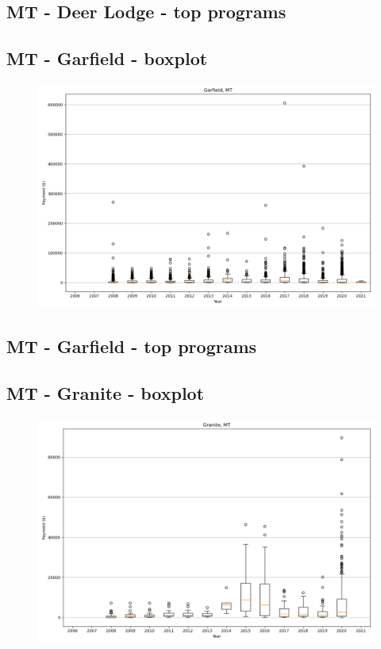 \subsection*{MT - Deer Lodge - top programs}

\newpage
\subsection*{MT - Garfield - boxplot}
\begin{figure}[h]
\centering
\includegraphics[width=7in]{../output/boxplots/counties/Garfield-MT_boxplot.png}
\end{figure}


\subsection*{MT - Garfield - top programs}

\newpage
\subsection*{MT - Granite - boxplot}
\begin{figure}[h]
\centering
\includegraphics[width=7in]{../output/boxplots/counties/Granite-MT_boxplot.png}
\end{figure}


